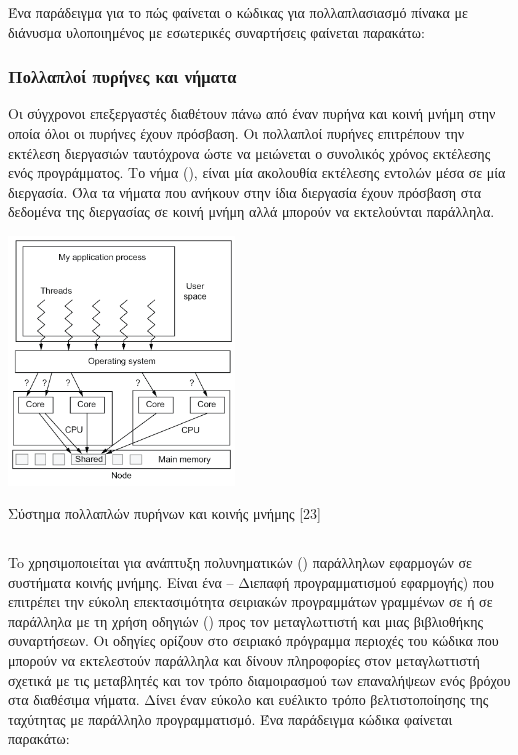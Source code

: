 Ένα παράδειγμα για το πώς φαίνεται ο κώδικας για πολλαπλασιασμό πίνακα με διάνυσμα υλοποιημένος με εσωτερικές συναρτήσεις φαίνεται παρακάτω:
 
\subsubsection{Πολλαπλοί πυρήνες και νήματα}

Οι σύγχρονοι επεξεργαστές διαθέτουν πάνω από έναν πυρήνα και κοινή μνήμη στην οποία όλοι οι πυρήνες έχουν πρόσβαση. Οι πολλαπλοί πυρήνες επιτρέπουν την εκτέλεση διεργασιών ταυτόχρονα ώστε να μειώνεται ο συνολικός χρόνος εκτέλεσης ενός προγράμματος. Το νήμα (), είναι μία ακολουθία εκτέλεσης εντολών μέσα σε μία διεργασία. Όλα τα νήματα που ανήκουν στην ίδια διεργασία έχουν πρόσβαση στα δεδομένα της διεργασίας σε κοινή μνήμη αλλά μπορούν να εκτελούνται παράλληλα.
 
\begin{Illustration}[!h] 
	\centering
	\includegraphics[width=0.45\textwidth]{images/image045.png} 
	\caption{Σύστημα πολλαπλών πυρήνων και κοινής μνήμης [23]}
	\label{image-multicore-shared-mem}
\end{Illustration}

\subsection{}

To  χρησιμοποιείται για ανάπτυξη πολυνηματικών () παράλληλων εφαρμογών σε συστήματα κοινής μνήμης. Είναι ένα  – Διεπαφή προγραμματισμού εφαρμογής) που επιτρέπει την εύκολη επεκτασιμότητα σειριακών προγραμμάτων γραμμένων σε  ή  σε παράλληλα με τη χρήση οδηγιών () προς τον μεταγλωττιστή και μιας βιβλιοθήκης συναρτήσεων. Οι οδηγίες ορίζουν στο σειριακό πρόγραμμα περιοχές του κώδικα που μπορούν να εκτελεστούν παράλληλα και δίνουν πληροφορίες στον μεταγλωττιστή σχετικά με τις μεταβλητές και τον τρόπο διαμοιρασμού των επαναλήψεων ενός βρόχου στα διαθέσιμα νήματα. Δίνει έναν εύκολο και ευέλικτο τρόπο βελτιστοποίησης της ταχύτητας με παράλληλο προγραμματισμό. 
Ένα παράδειγμα κώδικα φαίνεται παρακάτω:

